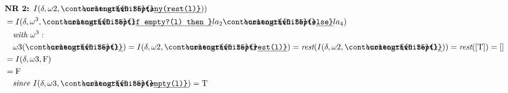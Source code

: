 \documentclass[10pt, a4paper]{article}
\newcommand{\ul}[1]{%
  \begingroup%
  \renewcommand{\ULdepth}{2.1pt}%
  \contourlength{0.35pt}%
  \uline{\phantom{#1}}\llap{\contour{white}{#1}}%
  \endgroup%
}
\newcommand{\Prog}[1]{\texttt{\ul{#1}}}
\begin{document}
\begin{align*}
\ & \textbf{NR 2: } I(\delta, \omega2, \Prog{any(rest(l)})) \\
\ &= I(\delta, \omega^3, \Prog{if empty?(l) then } la_2 \Prog{else} la_4) \\
\ &\quad \textit{with } \omega^3: \\
\ &\quad \omega3(\Prog{l}) = I(\delta, \omega2, \Prog{rest(l)}) = \textit{rest}(I(\delta, \omega2, \Prog{l})) = \textit{rest}([\text{T}]) = [ ] \\
\ &= I(\delta, \omega3, \text{F}) \\
\ &= \text{F} \\
\ &\quad \textit{since } I(\delta, \omega3, \Prog{empty(l)}) = \text{T}
\end{align*}
\end{document}
